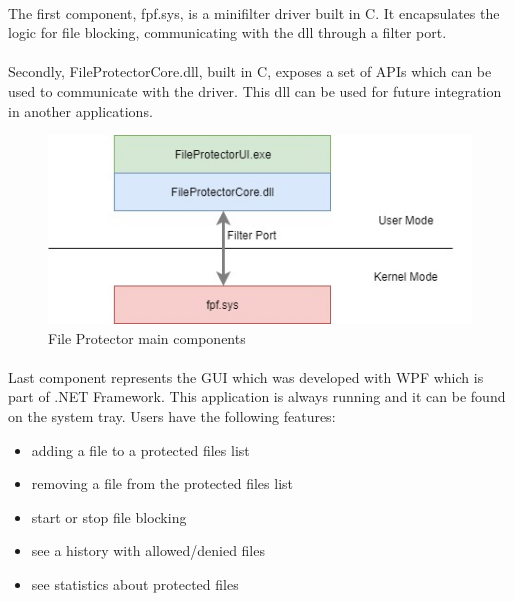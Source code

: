 		\paragraph{}
		The first component, fpf.sys, is a minifilter driver built in C. It encapsulates the logic for file blocking, communicating with the dll through a filter port.
		
		\paragraph{}
		Secondly, FileProtectorCore.dll, built in C, exposes a set of APIs which can be used to communicate with the driver. This dll can be used for future integration in another applications.
		
		\begin{figure}[h!]
			\begin{center}
				\includegraphics{images/fpMainComponents.jpg}
				\caption{File Protector main components}
				\label{fig:FPMAinComponents}
			\end{center}
		\end{figure}
		
		
		\paragraph{}
		Last component represents the GUI which was developed with WPF which is part of .NET Framework. This application is always running and it can be found on the system tray. Users have the following features:
		
		\begin{itemize}
			\item adding a file to a protected files list
			\item removing a file from the protected files list
			\item start or stop file blocking
			\item see a history with allowed/denied files
			\item see statistics about protected files
		\end{itemize}
		
